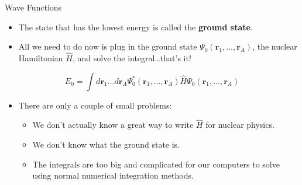 \documentclass{beamer}
\renewcommand{\r}{\mathbf{r}}
\begin{document}
\begin{frame}{Wave Functions}
\begin{itemize}
   \item The state that has the lowest energy is called the {\bf ground state}.
   \item All we need to do now is plug in the ground state $\Psi_0(\r_1,\ldots,\r_A)$, the nuclear Hamiltonian $\hat{H}$, and solve the integral\ldots that's it!
\end{itemize}
\begin{equation*}
   E_0 = \int d\r_1\ldots d\r_A \Psi_0^*(\r_1,\ldots,\r_A) \hat{H} \Psi_0(\r_1,\ldots,\r_A)
\end{equation*}
\begin{itemize}
   \item<2-> There are only a couple of small problems:
   \begin{itemize}
      \item<3-> We don't actually know a great way to write $\hat{H}$ for nuclear physics.
      \item<4-> We don't know what the ground state is.
      \item<5-> The integrals are too big and complicated for our computers to solve using normal numerical integration methods.
   \end{itemize}
\end{itemize}
\end{frame}
\end{document}
